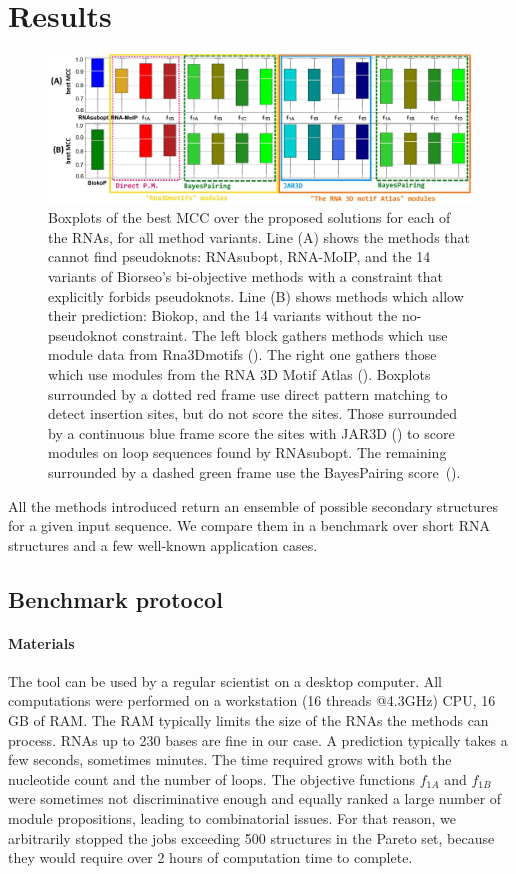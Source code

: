\documentclass{bioinfo}
\begin{document}
\section{Results}\label{sec:results}
\begin{figure}[!tbp]
   \includegraphics[width=\textwidth]{fig/Benchmark.jpg}
   \caption{Boxplots of the best MCC over the proposed solutions for each of the RNAs, for all method variants. Line (A) shows the methods that cannot find pseudoknots: RNAsubopt, RNA-MoIP, and the 14 variants of Biorseo's bi-objective methods with a constraint that explicitly forbids pseudoknots. Line (B) shows methods which allow their prediction: Biokop, and the 14 variants without the no-pseudoknot constraint. The left block gathers methods which use module data from Rna3Dmotifs (\citealp{djelloul_automated_2008}). The right one gathers those which use modules from the RNA 3D Motif Atlas (\citealp{petrov_automated_2013}). Boxplots surrounded by a dotted red frame use direct pattern matching to detect insertion sites, but do not score the sites. Those surrounded by a continuous blue frame score the sites with JAR3D (\citealp{zirbel_identifying_2015}) to score modules on loop sequences found by RNAsubopt. The remaining surrounded by a dashed green frame use the BayesPairing score~(\citealp{sarrazin2019automated}).}
   \label{fig:upgrades}
\end{figure}
All the methods introduced return an ensemble of possible secondary structures for a given input sequence. We compare them in a benchmark over short RNA structures and a few well-known application cases. 
\subsection{Benchmark protocol} \label{sec:bench}

\paragraph{Materials}
The tool can be used by a regular scientist on a desktop computer. All computations were performed on a workstation (16 threads @4.3GHz) CPU, 16 GB of RAM. The RAM typically limits the size of the RNAs the methods can process. RNAs up to 230 bases are fine in our case. A prediction typically takes a few seconds, sometimes minutes. The time required grows with both the nucleotide count and the number of loops. The objective functions $f_{1A}$ and $f_{1B}$ were sometimes not discriminative enough and equally ranked a large number of module propositions, leading to combinatorial issues. For that reason, we arbitrarily stopped the jobs exceeding 500 structures in the Pareto set, because they would require over 2 hours of computation time to complete. 
\end{document}
